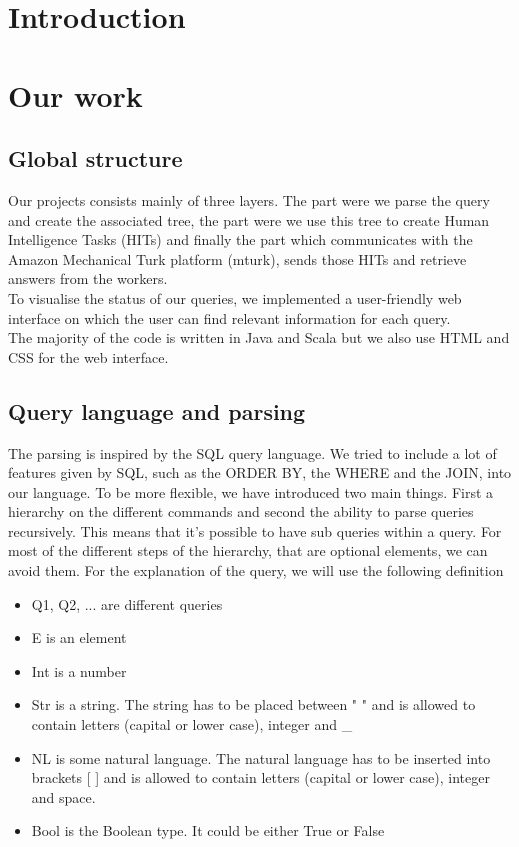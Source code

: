 \documentclass{article}
\begin{document}


\tableofcontents
\newpage


\section{Introduction}



\section{Our work} %
\subsection{Global structure}
Our projects consists mainly of three layers. The part were we parse the query and create the associated tree, the part were we use this tree to create Human Intelligence Tasks (HITs) and finally the part which communicates with the Amazon Mechanical Turk platform (mturk), sends those HITs and retrieve answers from the workers.\\
To visualise the status of our queries, we implemented a user-friendly web interface on which the user can find relevant information for each query.\\ The majority of the code is written in Java and Scala but we also use HTML and CSS for the web interface.
\subsection{Query language and parsing}
The parsing is inspired by the SQL query language. We tried to include a lot of features given by SQL, such as the ORDER BY, the WHERE and the JOIN, into our language. To be more flexible, we have introduced two main things. First a hierarchy on the different commands and second the ability to parse queries recursively. This means that it's possible to have sub queries within a query.
For most of the different steps of the hierarchy, that are optional elements, we can avoid them. %
For the explanation of the query, we will use the following definition
\begin{itemize}
\item Q1, Q2, ... are different queries
\item E is an element
\item Int is a number
\item Str is a string. The string has to be placed between " " and is allowed to contain letters (capital or lower case), integer and \_
\item NL is some natural language. The natural language has to be inserted into brackets [ ] and is allowed to contain letters (capital or lower case), integer and space.
\item Bool is the Boolean type. It could be either True or False
\end{itemize}
\end{document}
